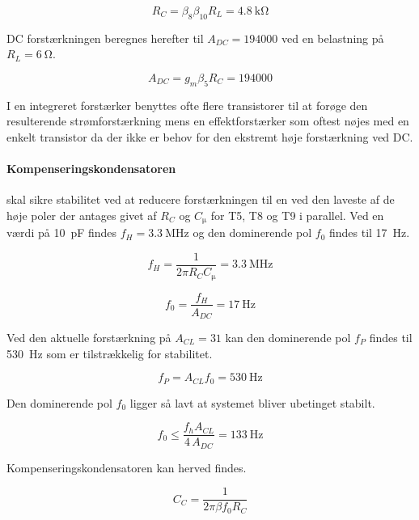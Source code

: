 \documentclass[danish]{article}
\begin{document}
\begin{equation}
R_C = \beta_8 \beta_{10} R_L = \SI{4.8}{\kilo\ohm}
\end{equation}

DC forstærkningen beregnes herefter til $A_{DC} = 194000$ ved en belastning på $R_L = \SI{6}{\ohm}$.

\begin{equation}
A_{DC} = g_m \beta_5 R_C = 194000
\end{equation}

I en integreret forstærker benyttes ofte flere transistorer til at forøge den resulterende strømforstærkning mens en effektforstærker som oftest nøjes med en enkelt transistor da der ikke er behov for den ekstremt høje forstærkning ved DC. 

\paragraph{Kompenseringskondensatoren} skal sikre stabilitet ved at reducere forstærkningen til en ved den laveste af de høje poler der antages givet af $R_C$ og $C_{\si{\micro}}$ for T5, T8 og T9 i parallel.
Ved en værdi på \SI{10}{\pico\farad} findes $f_H = \SI{3.3}{\mega\hertz}$ og den dominerende pol $f_0$ findes til \SI{17}{\hertz}. 

\begin{equation} 
f_H  = \frac{1}{2\pi R_C C_{\si{\micro}}} = \SI{3.3}{\mega\hertz}
\end{equation}

\begin{equation}
f_0 = \frac{f_H}{A_{DC}} = \SI{17}{\hertz}
\end{equation}

Ved den aktuelle forstærkning på $A_{CL} = 31$ kan den dominerende pol $f_P$ findes til \SI{530}{\hertz} som er tilstrækkelig for stabilitet.

\begin{equation}
f_P = A_{CL} f_0 = \SI{530}{\hertz}
\end{equation}

Den dominerende pol $f_0$ ligger så lavt at systemet bliver ubetinget stabilt.

\begin{equation} 
f_0  \leq \frac{f_h A_{CL}}{4\,A_{DC}} = \SI{133}{\hertz}
\end{equation}

Kompenseringskondensatoren kan herved findes.

\begin{equation} 
C_C  = \frac{1}{2\pi \beta f_0 R_C}
\end{equation}
\end{document}
